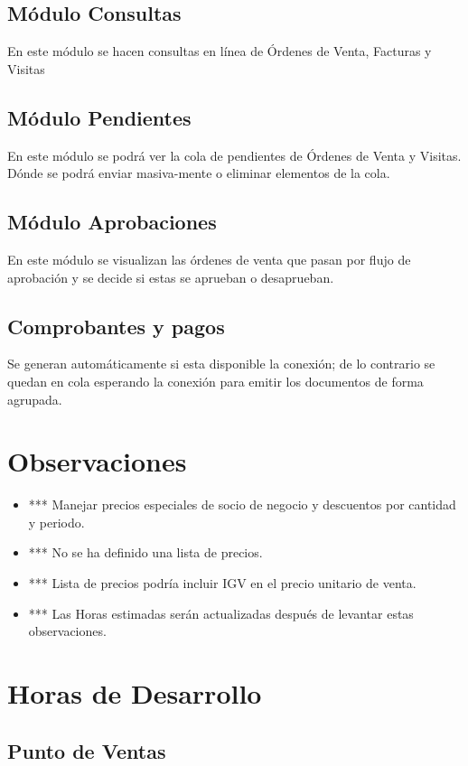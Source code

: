 \documentclass[pdftex,12pt,oneside,a4paper,spanish, english, brazil]{abntex2}
\begin{document}
\begin{sloppypar}
             \section{Módulo Consultas}
             En este módulo se hacen consultas en línea de Órdenes de Venta, Facturas y Visitas
             
             \section{Módulo Pendientes}
             En este módulo se podrá ver la cola de pendientes de Órdenes de Venta y Visitas. Dónde se podrá enviar masiva-mente o eliminar elementos de la cola.
             
             \section{Módulo Aprobaciones}
             En este módulo se visualizan las órdenes de venta que pasan por flujo de aprobación y se decide si estas se aprueban o desaprueban.
             \section{Comprobantes y pagos}
                Se generan automáticamente si esta disponible la conexión; de lo contrario se quedan en cola esperando la conexión para emitir los documentos de forma agrupada.
             \chapter{Observaciones}
             \begin{itemize}
             	\item *** Manejar precios especiales de socio de negocio y descuentos por cantidad y periodo.
             	\item *** No se ha definido una lista de precios.
             	\item *** Lista de precios podría incluir IGV en el precio unitario de venta.
             	\item *** Las Horas estimadas serán actualizadas después de levantar estas observaciones.
             \end{itemize}
             \chapter{Horas de Desarrollo}
             \section{Punto de Ventas}
             \begin{table}[htbp]
             	\small
             	\centering
             	

\end{table}
\end{sloppypar}
\end{document}
